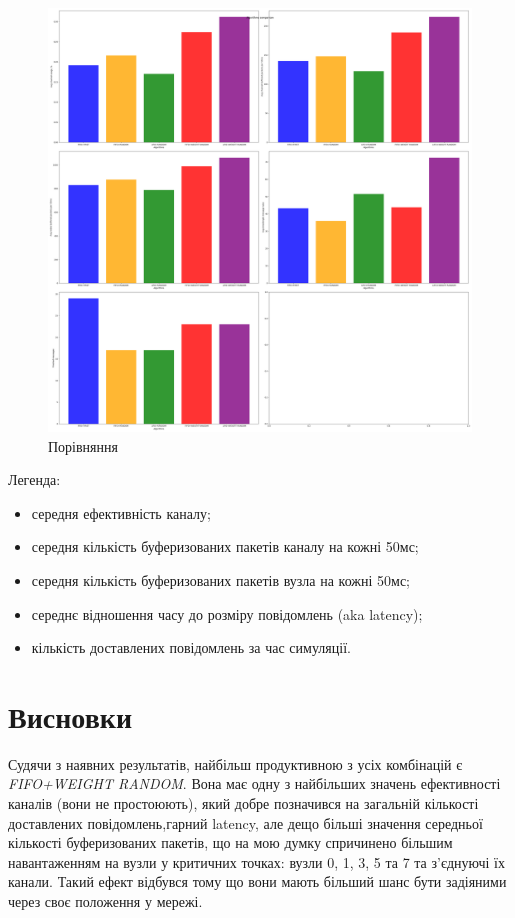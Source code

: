 \documentclass[11pt,a4paper]{article}
\begin{document}
\begin{figure}[H]
\includegraphics[width=\textwidth]{comparison.png}
\caption{Порівняння}
\end{figure}

Легенда:
\begin{itemize}
\item середня ефективність каналу;
\item середня кількість буферизованих пакетів каналу на кожні 50мс;
\item середня кількість буферизованих пакетів вузла на кожні 50мс;
\item середнє відношення часу до розміру повідомлень (aka latency);
\item кількість доставлених повідомлень за час симуляції.
\end{itemize}

\section{Висновки}

Судячи з наявних результатів, найбільш продуктивною з усіх комбінацій є
\emph{FIFO+WEIGHT RANDOM}. Вона має одну з найбільших значень ефективності каналів 
(вони не простоюють), який добре позначився на загальній кількості 
доставлених повідомлень,гарний latency, але дещо більші значення середньої кількості 
буферизованих пакетів, що
на мою думку спричинено більшим навантаженням на вузли у критичних точках:
вузли 0, 1, 3, 5 та 7 та з'єднуючі їх канали. Такий ефект відбувся тому що вони мають
більший шанс бути задіяними через своє положення у мережі.
\end{document}
